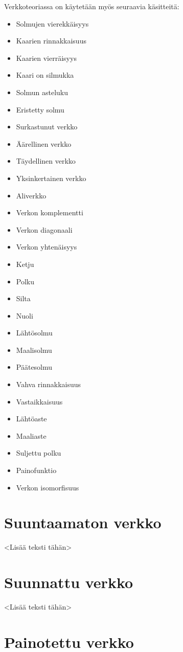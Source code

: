 Verkkoteoriassa on käytetään myös seuraavia käsitteitä:
\begin{itemize}
  \item Solmujen vierekkäisyys
  \item Kaarien rinnakkaisuus
  \item Kaarien vierräisyys
  \item Kaari on silmukka
  \item Solmun asteluku
  \item Eristetty solmu
  \item Surkastunut verkko
  \item Äärellinen verkko
  \item Täydellinen verkko
  \item Yksinkertainen verkko
  \item Aliverkko
  \item Verkon komplementti
  \item Verkon diagonaali
  \item Verkon yhtenäisyys
  \item Ketju
  \item Polku
  \item Silta
  \item Nuoli
  \item Lähtösolmu
  \item Maalisolmu
  \item Päätesolmu
  \item Vahva rinnakkaisuus
  \item Vastaikkaisuus
  \item Lähtöaste
  \item Maaliaste
  \item Suljettu polku
  \item Painofunktio
  \item Verkon isomorfisuus
\end{itemize}

\section{Suuntaamaton verkko}

<Lisää teksti tähän>

\section{Suunnattu verkko}

<Lisää teksti tähän>

\section{Painotettu verkko}

